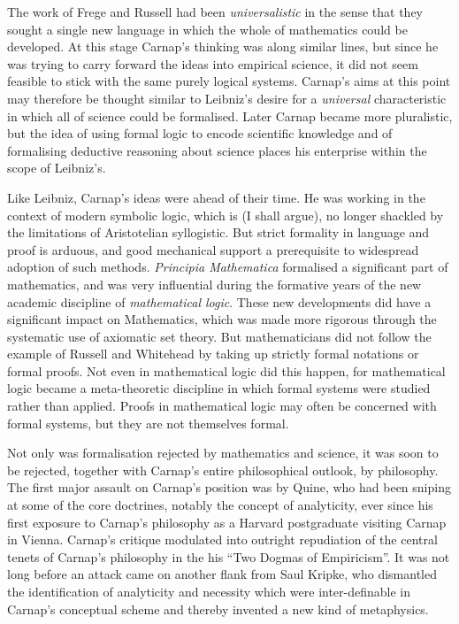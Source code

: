 The work of Frege and Russell had been \emph{universalistic} in the sense that they sought a single new language in which the whole of mathematics could be developed.
At this stage Carnap's thinking was along similar lines, but since he was trying to carry forward the ideas into empirical science, it did not seem feasible to stick with the same purely logical systems.
Carnap's aims at this point may therefore be thought similar to Leibniz's desire for a \emph{universal} characteristic in which all of science could be formalised.
Later Carnap became more pluralistic, but the idea of using formal logic to encode scientific knowledge and of formalising deductive reasoning about science places his enterprise within the scope of Leibniz's.

Like Leibniz, Carnap's ideas were ahead of their time.
He was working in the context of modern symbolic logic, which is (I shall argue), no longer shackled by the limitations of Aristotelian syllogistic.
But strict formality in language and proof is arduous, and good mechanical support a prerequisite to widespread adoption of such methods.
\emph{Principia Mathematica} formalised a significant part of mathematics, and was very influential during the formative years of the new academic discipline of \emph{mathematical logic}.
These new developments did have a significant impact on Mathematics, which was made more rigorous through the systematic use of axiomatic set theory.
But mathematicians did not follow the example of Russell and Whitehead by taking up strictly formal notations or formal proofs.
Not even in mathematical logic did this happen, for mathematical logic became a meta-theoretic discipline in which formal systems were studied rather than applied.
Proofs in mathematical logic may often be concerned with formal systems, but they are not themselves formal.

Not only was formalisation rejected by mathematics and science, it was soon to be rejected, together with Carnap's entire philosophical outlook, by philosophy.
The first major assault on Carnap's position was by Quine, who had been sniping at some of the core doctrines, notably the concept of analyticity, ever since his first exposure to Carnap's philosophy as a Harvard postgraduate visiting Carnap in Vienna.
Carnap's critique modulated into outright repudiation of the central tenets of Carnap's philosophy in the his ``Two Dogmas of Empiricism''.
It was not long before an attack came on another flank from Saul Kripke, who dismantled the identification of analyticity and necessity which were inter-definable in Carnap's conceptual scheme and thereby invented a new kind of metaphysics.

